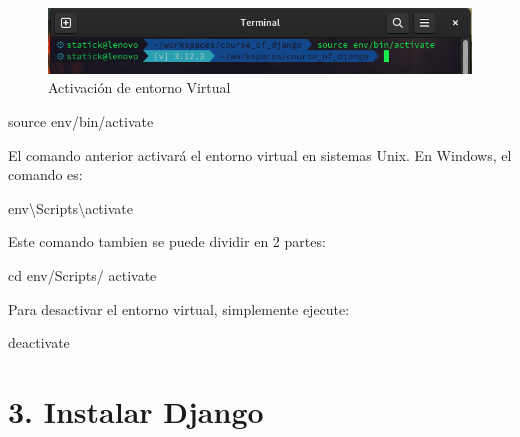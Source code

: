 \documentclass[
  a4paper,
  DIV=11,
  numbers=noendperiod,
  onepage,
  openany]{scrreprt}
\newenvironment{Shaded}{\begin{snugshade}}{\end{snugshade}}
\newcommand{\BuiltInTok}[1]{\textcolor[rgb]{0.00,0.23,0.31}{#1}}
\newcommand{\DataTypeTok}[1]{\textcolor[rgb]{0.68,0.00,0.00}{#1}}
\newcommand{\ExtensionTok}[1]{\textcolor[rgb]{0.00,0.23,0.31}{#1}}
\newcommand{\FunctionTok}[1]{\textcolor[rgb]{0.28,0.35,0.67}{#1}}
\newcommand{\NormalTok}[1]{\textcolor[rgb]{0.00,0.23,0.31}{#1}}
\begin{document}
\begin{tcolorbox}
\begin{figure}[H]
{\centering \includegraphics{images/activacion_entorno_virtual.png}

}

\caption{Activación de entorno Virtual}

\end{figure}%

\begin{Shaded}
\begin{Highlighting}[]
\BuiltInTok{source}\NormalTok{ env/bin/activate}
\end{Highlighting}
\end{Shaded}

El comando anterior activará el entorno virtual en sistemas Unix. En
Windows, el comando es:

\begin{Shaded}
\begin{Highlighting}[]
\FunctionTok{env}\DataTypeTok{\textbackslash{}S}\NormalTok{cripts}\DataTypeTok{\textbackslash{}a}\NormalTok{ctivate}
\end{Highlighting}
\end{Shaded}

Este comando tambien se puede dividir en 2 partes:

\begin{Shaded}
\begin{Highlighting}[]
\BuiltInTok{cd}\NormalTok{ env/Scripts/}
\ExtensionTok{activate}
\end{Highlighting}
\end{Shaded}

Para desactivar el entorno virtual, simplemente ejecute:

\begin{Shaded}
\begin{Highlighting}[]
\ExtensionTok{deactivate}
\end{Highlighting}
\end{Shaded}

\section{3. Instalar Django}\label{instalar-django}

\begin{figure}[H]


\end{figure}
\end{tcolorbox}
\end{document}
